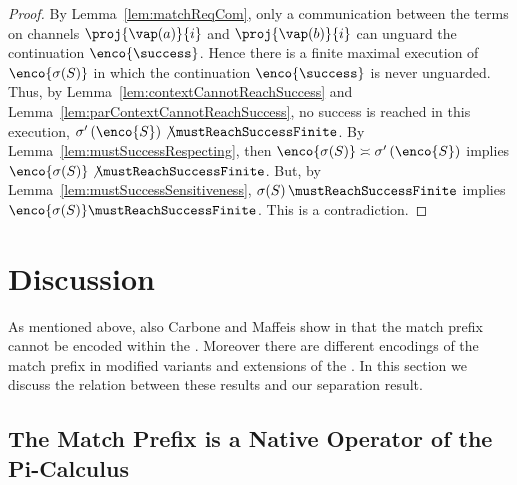 \documentclass[]{article}
\begin{document}
\begin{proof}
	By Lemma~\ref{lem:matchReqCom}, only a communication between the terms on channels $ \proj{\vap\!\left( a \right)}{i} $ and $ \proj{\vap\!\left( b \right)}{i} $ can unguard the continuation $ \enco{\success} $. Hence there is a finite maximal execution of $ \enco{\sigma\!\left( S \right)} $ in which the continuation $ \enco{\success} $ is never unguarded.
	Thus, by Lemma~\ref{lem:contextCannotReachSuccess} and Lemma~\ref{lem:parContextCannotReachSuccess}, no success is reached in this execution, \ie $ \sigma'\left( \enco{S} \right) \not\mustReachSuccessFinite $.
	By Lemma~\ref{lem:mustSuccessRespecting}, then $ \enco{\sigma\!\left( S \right)} \asymp \sigma'\left( \enco{S} \right) $ implies $ \enco{\sigma\!\left( S \right)} \not\mustReachSuccessFinite $.
	But, by Lemma~\ref{lem:mustSuccessSensitiveness}, $ \sigma\!\left( S \right) \mustReachSuccessFinite $ implies $ \enco{\sigma\!\left( S \right)} \mustReachSuccessFinite $.
	This is a contradiction.
\end{proof}



\section{Discussion}
\label{sec:discussion}

As mentioned above, also Carbone and Maffeis show in \cite{carbone} that the match prefix cannot be encoded within the \piCal. Moreover there are different encodings of the match prefix in modified variants and extensions of the \piCal. In this section we discuss the relation between these results and our separation result.

\subsection{The Match Prefix is a Native Operator of the Pi-Calculus}
\label{sec:comparison}
\end{document}
